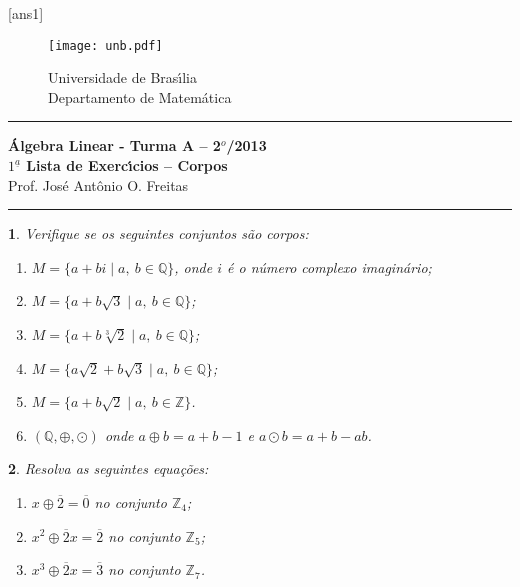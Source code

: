 \documentclass[12pt]{exam}
\newtheorem{exercicio}{}
\newcommand{\integer}{\mathbb{Z}}
\newcommand{\cp}[1]{\mathbb{#1}}
\newcommand{\vesp}[1]{\vspace{ #1  cm}}
\begin{document}
\pagestyle{empty}

[ans1]

\begin{figure}[h]
        \begin{minipage}[c]{1.7cm}
        \texttt{[image: unb.pdf]}
        \end{minipage}%
        \hspace{0pt}
        \begin{minipage}[c]{4in}
          {Universidade de Bras{\'\i}lia} \\
          {Departamento de Matem{\'a}tica}
\end{minipage}
\end{figure}

\vesp{-0.35} \hrule

\begin{center}
{\Large\bf \'Algebra Linear - Turma A -- 2$^{o}$/2013} \\ \vspace{9pt} {\large\bf
  $1^{\underline{a}}$ Lista de Exerc{\'\i}cios -- Corpos}\\ \vspace{9pt} Prof. Jos{\'e} Ant{\^o}nio O. Freitas
\end{center}
\hrule

\vesp{.6}

\begin{exercicio}
Verifique se os seguintes conjuntos s\~ao corpos:
\begin{enumerate}[label={\alph*})]
    \item $M = \{ a + bi \mid a,\ b \in \cp{Q}\}$, onde $i$ \'e o n\'umero complexo imagin\'ario;
    \item $M = \{ a + b\sqrt{3} \mid a,\ b \in \cp{Q}\}$;
    \item $M = \{ a + b\sqrt[3]{2} \mid a,\ b \in \cp{Q}\}$;
    \item $M = \{ a\sqrt{2} + b\sqrt{3} \mid a,\ b \in \cp{Q}\}$;
    \item $M = \{ a + b\sqrt{2} \mid a,\ b \in \cp{Z}\}$.
    \item $(\cp{Q}, \oplus, \odot)$ onde $a \oplus b = a + b - 1$ e $a \odot b = a + b - ab$.
  \end{enumerate}  
\end{exercicio}

\begin{exercicio}
Resolva as seguintes equa\c{c}\~oes:
\begin{enumerate}[label={\alph*})]
  \item $x \oplus \overline{2} = \overline{0}$ no conjunto $\integer_4$;
  \item $x^2 \oplus \overline{2}x = \overline{2}$ no conjunto $\integer_5$;
  \item $x^3 \oplus \overline{2}x = \overline{3}$ no conjunto $\integer_7$.
\end{enumerate}
\end{exercicio}
\end{document}
